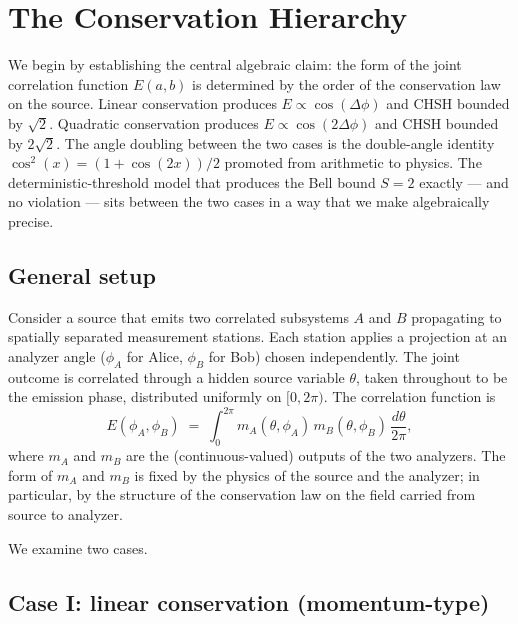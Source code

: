 \documentclass[
  11pt]{article}
\begin{document}
\section{The Conservation Hierarchy}\label{sec-hierarchy}

We begin by establishing the central algebraic claim: the form of the
joint correlation function \(E(a,b)\) is determined by the order of the
conservation law on the source. Linear conservation produces
\(E \propto \cos(\Delta\phi)\) and CHSH bounded by \(\sqrt{2}\).
Quadratic conservation produces \(E \propto \cos(2\Delta\phi)\) and CHSH
bounded by \(2\sqrt{2}\). The angle doubling between the two cases is
the double-angle identity \(\cos^2(x) = (1 + \cos(2x))/2\) promoted from
arithmetic to physics. The deterministic-threshold model that produces
the Bell bound \(S = 2\) exactly --- and no violation --- sits between
the two cases in a way that we make algebraically precise.

\subsection{General setup}\label{general-setup}

Consider a source that emits two correlated subsystems \(A\) and \(B\)
propagating to spatially separated measurement stations. Each station
applies a projection at an analyzer angle (\(\phi_A\) for Alice,
\(\phi_B\) for Bob) chosen independently. The joint outcome is
correlated through a hidden source variable \(\theta\), taken throughout
to be the emission phase, distributed uniformly on \([0, 2\pi)\). The
correlation function is \[
E(\phi_A, \phi_B) \;=\; \int_0^{2\pi} m_A(\theta, \phi_A)\, m_B(\theta, \phi_B)\, \frac{d\theta}{2\pi},
\] where \(m_A\) and \(m_B\) are the (continuous-valued) outputs of the
two analyzers. The form of \(m_A\) and \(m_B\) is fixed by the physics
of the source and the analyzer; in particular, by the structure of the
conservation law on the field carried from source to analyzer.

We examine two cases.

\subsection{Case I: linear conservation
(momentum-type)}\label{case-i-linear-conservation-momentum-type}
\end{document}
